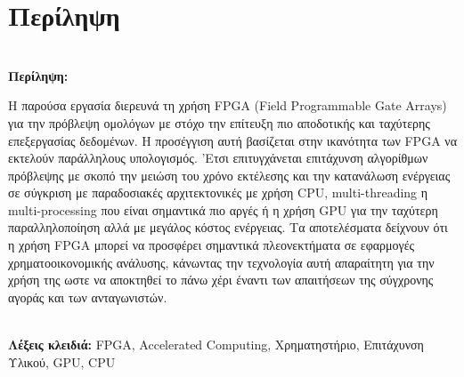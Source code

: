 \chapter*{\center \Large  Περίληψη}

~\\[1cm]%
\noindent\textbf{Περίληψη:} %

Η παρούσα εργασία διερευνά τη χρήση FPGA (Field Programmable Gate Arrays) για την πρόβλεψη ομολόγων
με στόχο την επίτευξη πιο αποδοτικής και ταχύτερης επεξεργασίας δεδομένων. Η προσέγγιση αυτή βασίζεται 
στην ικανότητα των FPGA να εκτελούν παράλληλους υπολογισμός. 'Ετσι επιτυγχάνεται επιτάχυνση αλγορίθμων πρόβλεψης
με σκοπό την μειώση του χρόνο εκτέλεσης και την κατανάλωση ενέργειας σε σύγκριση με παραδοσιακές αρχιτεκτονικές
με χρήση CPU, multi-threading η multi-processing που είναι σημαντικά πιο αργές ή η χρήση GPU για την ταχύτερη παραλληλοποίηση αλλά με μεγάλος κόστος ενέργειας.
Τα αποτελέσματα δείχνουν ότι η χρήση FPGA μπορεί να προσφέρει σημαντικά πλεονεκτήματα σε εφαρμογές χρηματοοικονομικής ανάλυσης,
κάνωντας την τεχνολογία αυτή απαραίτητη για την χρήση της ωστε να αποκτηθεί το πάνω χέρι έναντι των απαιτήσεων της σύγχρονης αγοράς και των ανταγωνιστών.


~\\[1cm]
\noindent %
\textbf{Λέξεις κλειδιά:} FPGA, Accelerated Computing, Χρηματηστήριο, Επιτάχυνση Υλικού, GPU, CPU 